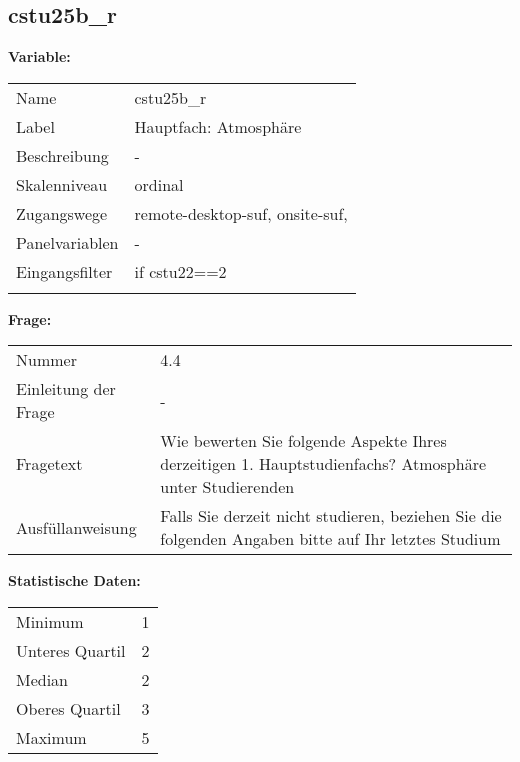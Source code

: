 	
	
	\subsection{cstu25b\_r}
	\label{subSection:cstu25b_r}

	\noindent\textbf{Variable:}\\
		\begin{tabular}{lL{11.3cm}}
			\label{tableVariable:cstu25b_r}
			Name & cstu25b\_r \\
			Label & Hauptfach: Atmosphäre \\
			Beschreibung & - \\
			Skalenniveau & ordinal \\
			Zugangswege &
				remote-desktop-suf,
				onsite-suf,
 \\
			Panelvariablen & -
			 \\
			Eingangsfilter & if cstu22==2 \\
 \\
		\end{tabular}

		\vspace*{1 cm}
		\noindent\textbf{Frage:}\\
		\begin{tabular}{lL{11.3cm}}
			\label{tableQuestion:cstu25b_r}
			Nummer & 4.4 \\
			Einleitung der Frage & - \\
			Fragetext & Wie bewerten Sie folgende Aspekte Ihres derzeitigen 1. Hauptstudienfachs?
Atmosphäre unter Studierenden \\
			Ausfüllanweisung & Falls Sie derzeit nicht studieren, beziehen Sie die folgenden Angaben bitte auf Ihr letztes Studium \\
		\end{tabular}


		\vspace*{1 cm}
		\noindent\textbf{Statistische Daten:}\\
			\begin{tabular}{ll}
				\label{tableStatistics:cstu25b_r}
					Minimum & 1 \\
					Unteres Quartil & 2 \\
					Median & 2 \\
					Oberes Quartil & 3 \\
					Maximum & 5 \\
			\end{tabular}



